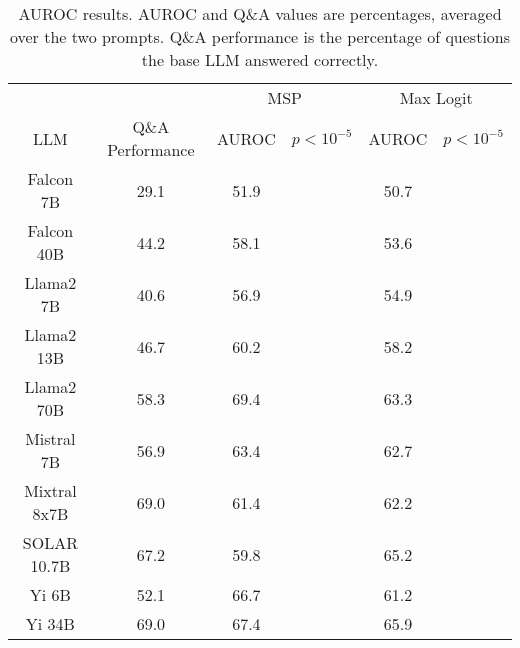 \begin{table*}
\centering
\begin{tabular}{c|c|c|c|c|c}
& & \multicolumn{2}{c|}{MSP} & \multicolumn{2}{c}{Max Logit} \\ 
LLM & Q\&A Performance & AUROC & $p < 10^{-5}$ & AUROC & $p < 10^{-5}$\\ \hline
Falcon 7B & 29.1 & 51.9 &  & 50.7 & \\
Falcon 40B & 44.2 & 58.1 &  & 53.6 & \\
Llama2 7B & 40.6 & 56.9 &  & 54.9 & \\
Llama2 13B & 46.7 & 60.2 &  & 58.2 & \\
Llama2 70B & 58.3 & 69.4 &  & 63.3 & \\
Mistral 7B & 56.9 & 63.4 &  & 62.7 & \\
Mixtral 8x7B & 69.0 & 61.4 &  & 62.2 & \\
SOLAR 10.7B & 67.2 & 59.8 &  & 65.2 & \\
Yi 6B & 52.1 & 66.7 &  & 61.2 & \\
Yi 34B & 69.0 & 67.4 &  & 65.9 & \\
\hline
\end{tabular}
\caption{AUROC results. AUROC and Q\&A values are percentages, averaged over the two prompts. Q\&A performance is the percentage of questions the base LLM answered correctly.}
\label{tab:auroc}
\end{table*}
